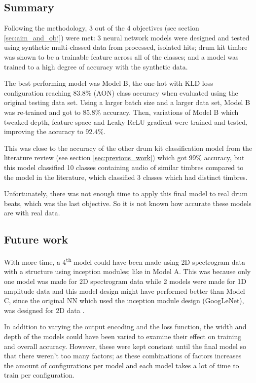 \documentclass[12pt]{article}
\begin{document}
	\subsection{Summary}
	
	Following the methodology, 3 out of the 4 objectives (see section \ref{sec:aim_and_obj}) were met: 3 neural network models were designed and tested using synthetic multi-classed data from processed, isolated hits; drum kit timbre was shown to be a trainable feature across all of the classes; and a model was trained to a high degree of accuracy with the synthetic data.\medskip
	
	The best performing model was Model B, the one-hot with KLD loss configuration reaching 83.8\% (AON) class accuracy when evaluated using the original testing data set. Using a larger batch size and a larger data set, Model B was re-trained and got to 85.8\% accuracy. Then, variations of Model B which tweaked depth, feature space and Leaky ReLU gradient were trained and tested, improving the accuracy to 92.4\%.\medskip
	
	This was close to the accuracy of the other drum kit classification model from the literature review (see section \ref{sec:previous_work}) which got 99\% accuracy, but this model classified 10 classes containing audio of similar timbres compared to the model in the literature, which classified 3 classes which had distinct timbres.\medskip
	
	Unfortunately, there was not enough time to apply this final model to real drum beats, which was the last objective. So it is not known how accurate these models are with real data.\medskip 
	
	\subsection{Future work}
    
    With more time, a 4\textsuperscript{th} model could have been made using 2D spectrogram data with a structure using inception modules; like in Model A. This was because only one model was made for 2D spectrogram data while 2 models were made for 1D amplitude data and this model design might have performed better than Model C, since the original NN which used the inception module design (GoogLeNet), was designed for 2D data \parencite{Oord2016}.\medskip
    
    In addition to varying the output encoding and the loss function, the width and depth of the models could have been varied to examine their effect on training and overall accuracy. However, these were kept constant until the final model so that there weren't too many factors; as these combinations of factors increases the amount of configurations per model and each model takes a lot of time to train per configuration.\medskip
    
\end{document}
